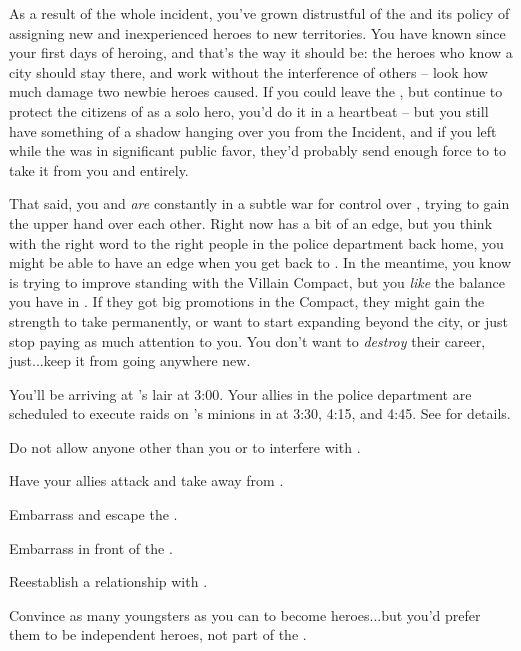 \documentclass[char]{LRSguildcamp1}
\begin{document}
As a result of the whole incident, you've grown distrustful of the \cHeroLeague{\intro} and its policy of assigning new and inexperienced heroes to new territories.  You have known \pCityO{} since your first days of heroing, and that's the way it should be: the heroes who know a city should stay there, and work without the interference of others -- look how much damage two newbie heroes caused.  If you could leave the \cHeroLeague{}, but continue to protect the citizens of \pCityO{} as a solo hero, you'd do it in a heartbeat -- but you still have something of a shadow hanging over you from the \pCityO{} Incident, and if you left while the \cHeroLeague{} was in significant public favor, they'd probably send enough force to \pCityO{} to take it from you and \cOldest{} entirely.


That said, you and \cOldest{} \emph{are} constantly in a subtle war for control over \pCityO{}, trying to gain the upper hand over each other.  Right now \cOldest{} has a bit of an edge, but you think with the right word to the right people in the police department back home, you might be able to have an edge when you get back to \pCityO{}.  In the meantime, you know \cOldest{} is trying to improve \cOldest{\their} standing with the Villain Compact, but you {\em like} the balance you have in \pCityO{}.  If they got big promotions in the Compact, they might gain the strength to take \pCityO{} permanently, or want to start expanding beyond the city, or just stop paying as much attention to you.  You don't want to {\em destroy} their career, just...keep it from going anywhere new.

You'll be arriving at \cGrandma{}'s lair at 3:00.  Your allies in the police department are scheduled to execute raids on \cOldest{}'s minions in \pCityO{} at 3:30, 4:15, and 4:45.  See \gAttackCities{} for details.

\begin{itemz}[Goals]
	\item Do not allow anyone other than you or \cOS{} to interfere with \pCityO{}.  %
	\item Have your allies attack and take \pCityO{} away from \cOldest{}.
	\item Embarrass and escape the \cHeroLeague{\intro}.
	\item Embarrass \cOldest{} in front of the \cVillainCompact{\intro}.
	\item Reestablish a relationship with \cGrad{}.
	\item Convince as many youngsters as you can to become heroes...but you'd prefer them to be independent heroes, not part of the \cHeroLeague{}.
\end{itemz}
\end{document}
